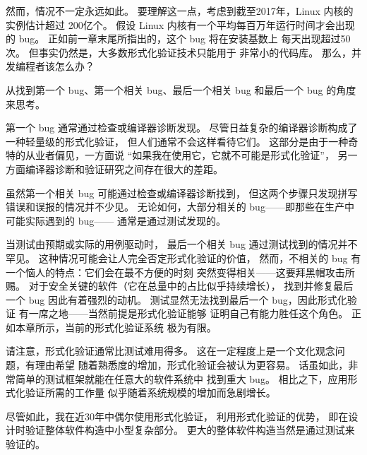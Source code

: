 然而，情况不一定永远如此。
要理解这一点，考虑到截至2017年，Linux 内核的实例估计超过
200亿个。
假设 Linux 内核有一个平均每百万年运行时间才会出现的 bug。
正如前一章末尾所指出的，这个 bug 将在安装基数上
每天出现超过50次。
但事实仍然是，大多数形式化验证技术只能用于
非常小的代码库。
那么，并发编程者该怎么办？

从找到第一个 bug、第一个相关 bug、最后一个相关 bug
和最后一个 bug 的角度来思考。

第一个 bug 通常通过检查或编译器诊断发现。
尽管日益复杂的编译器诊断构成了一种轻量级的形式化验证，
但人们通常不会这样看待它们。
这部分是由于一种奇特的从业者偏见，一方面说
``如果我在使用它，它就不可能是形式化验证''，
另一方面编译器诊断和验证研究之间存在很大的差距。

虽然第一个相关 bug 可能通过检查或编译器诊断找到，
但这两个步骤只发现拼写错误和误报的情况并不少见。
无论如何，大部分相关的 bug——即那些在生产中可能实际遇到的 bug——
通常是通过测试发现的。

当测试由预期或实际的用例驱动时，
最后一个相关 bug 通过测试找到的情况并不罕见。
这种情况可能会让人完全否定形式化验证的价值，
然而，不相关的 bug 有一个恼人的特点：它们会在最不方便的时刻
突然变得相关——这要拜黑帽攻击所赐。
对于安全关键的软件（它在总量中的占比似乎持续增长），
找到并修复最后一个 bug 因此有着强烈的动机。
测试显然无法找到最后一个 bug，因此形式化验证
有一席之地——当然前提是形式化验证能够
证明自己有能力胜任这个角色。
正如本章所示，当前的形式化验证系统
极为有限。

\QuickQuizEnd

请注意，形式化验证通常比测试难用得多。
这在一定程度上是一个文化观念问题，有理由希望
随着熟悉度的增加，形式化验证会被认为更容易。
话虽如此，非常简单的测试框架就能在任意大的软件系统中
找到重大 bug。
相比之下，应用形式化验证所需的工作量
似乎随着系统规模的增加而急剧增长。

尽管如此，我在近30年中偶尔使用形式化验证，
利用形式化验证的优势，
即在设计时验证整体软件构造中小型复杂部分。
更大的整体软件构造当然是通过测试来验证的。

